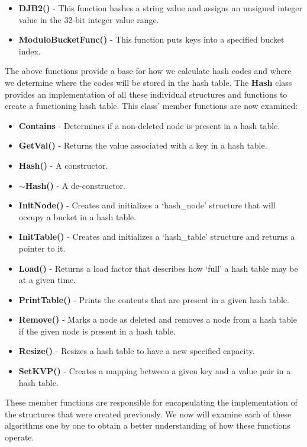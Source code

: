 \documentclass[a4paper,9pt]{article}
\begin{document}
\begin{itemize}
    \item \textbf{DJB2()} - This function hashes a string value and assigns an unsigned integer value in the 32-bit integer value range.
    \item \textbf{ModuloBucketFunc()} - This function puts keys into a specified bucket index.
\end{itemize}

\noindent The above functions provide a base for how we calculate hash codes and where we determine where the codes will be stored in the hash table. The \textbf{Hash} class provides an implementation of all
these individual structures and functions to create a functioning hash table. This class' member functions are now examined:

\begin{itemize}
    \item \textbf{Contains} - Determines if a non-deleted node is present in a hash table.
    \item \textbf{GetVal()} - Returns the value associated with a key in a hash table.
    \item \textbf{Hash()} - A constructor.
    \item \textbf{$\sim$Hash()} - A de-constructor.
    \item \textbf{InitNode()} - Creates and initializes a `hash\_node' structure that will occupy a bucket in a hash table.
    \item \textbf{InitTable()} - Creates and initializes a `hash\_table' structure and returns a pointer to it.
    \item \textbf{Load()} - Returns a load factor that describes how `full' a hash table may be at a given time.
    \item \textbf{PrintTable()} - Prints the contents that are present in a given hash table.
    \item \textbf{Remove()} - Marks a node as deleted and removes a node from a hash table if the given node is present in a hash table.
    \item \textbf{Resize()} - Resizes a hash table to have a new specified capacity.
    \item \textbf{SetKVP()} - Creates a mapping between a given key and a value pair in a hash table. 
\end{itemize}

\noindent These member functions are responsible for encapsulating the implementation of the structures that were created previously. We now will examine each of these algorithms one by one to obtain a better 
understanding of how these functions operate.
\end{document}
